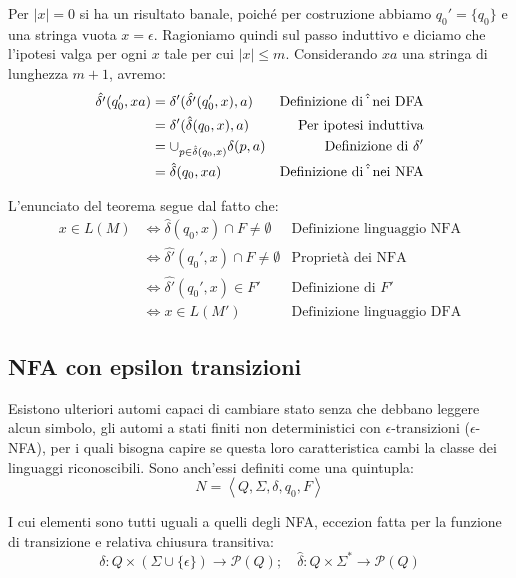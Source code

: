 \noindent Per $|x| = 0$ si ha un risultato banale, poiché per costruzione abbiamo $q_0' = \{q_0\}$ e una stringa vuota $x = \epsilon$. Ragioniamo quindi
sul passo induttivo e diciamo che l'ipotesi valga per ogni $x$ tale per cui $|x| \leq m$. Considerando $xa$ una stringa di lunghezza $m+1$, avremo:
\begin{equation}
	\begin{aligned}
		\hat{\delta'}(q_0', xa) &= \delta'(\hat{\delta'}(q_0', x), a) & \text{Definizione di $\hat{\dot}$ nei DFA}\\
			&= \delta'(\hat{\delta}(q_0, x), a) & \text{Per ipotesi induttiva}\\
			&= \cup_{p\in \hat{\delta}(q_0, x)} \delta(p,a) & \text{Definizione di } \delta'\\
			&= \hat{\delta}(q_0, xa) & \text{Definizione di $\hat{\dot}$ nei NFA}
	\end{aligned}
\end{equation}

\noindent L'enunciato del teorema segue dal fatto che: \begin{equation}
	\begin{aligned}
		x\in L(M) &\iff \hat{\delta}(q_0, x) \cap F\neq \emptyset & \text{Definizione linguaggio NFA}\\
			&\iff \hat{\delta'}(q_0', x) \cap F\neq \emptyset & \text{Proprietà dei NFA}\\
			&\iff \hat{\delta'}(q_0', x) \in F' & \text{Definizione di } F'\\
			&\iff x\in L(M') & \text{Definizione linguaggio DFA}
	\end{aligned}
\end{equation}

\subsection{NFA con epsilon transizioni}
Esistono ulteriori automi capaci di cambiare stato senza che debbano leggere alcun simbolo, gli automi a stati finiti non deterministici con
$\epsilon$-transizioni ($\epsilon$-NFA), per i quali bisogna capire se questa loro caratteristica cambi la classe dei linguaggi riconoscibili. Sono
anch'essi definiti come una quintupla: \[
	N = \left<Q, \Sigma, \delta, q_0, F \right>
\]

\noindent I cui elementi sono tutti uguali a quelli degli NFA, eccezion fatta per la funzione di transizione e relativa chiusura transitiva: \[
	\delta : Q\times (\Sigma \cup \{\epsilon\}) \to \mathcal{P}(Q);\quad \hat{\delta} : Q\times \Sigma^* \to \mathcal{P}(Q)
\]

